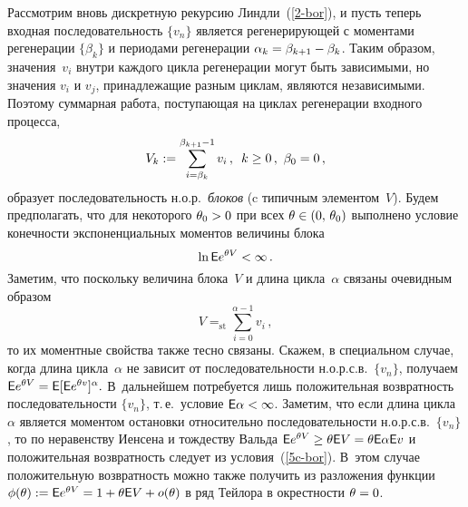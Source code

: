\begin{multicols}{2}
 Рассмотрим вновь дискретную рекурсию Линдли~(\ref{2-bor}), и пусть теперь входная
 последовательность $\{v_n\}$ является регенерирующей с моментами
регенерации $\{\beta_k\}$ и периодами регенерации
$\alpha_k\hm=\beta_{k+1}\hm-\beta_k$. Таким образом,  значения~$v_i$
внутри каждого цикла регенерации могут быть зависимыми, но значения
$v_i$ и $v_j$, принадлежащие разным циклам, являются независимыми.
Поэтому  суммарная работа, поступающая на циклах регенерации
входного процесса,
\begin{equation}
   V_k:=\sum\limits_{i=\beta_k}^{\beta_{k+1}-1}v_i\,,\enskip k\ge
  0\,,\ \beta_0=0\,,
  \label{vor-eq9}
\end{equation}
образует последовательность н.о.р.\ {\it блоков} (c типичным
элементом~$V$). Будем предполагать, что для некоторого $\theta_0\hm>0$
при всех $\theta\hm\in (0,\,\theta_0)$
 выполнено  условие конечности экспоненциальных моментов величины блока
\begin{equation}
\ln {\sf E} e^{\theta V}<\infty\,.\label{5c-bor}
\end{equation}
Заметим, что поскольку величина блока~$V$ и длина цикла~$\alpha$
связаны очевидным образом
\begin{equation}
V=_{\mathrm{st}}\sum\limits_{i=0}^{\alpha-1}v_i\,, \label{24-bor}
\end{equation}
то их  моментные свойства также тесно связаны.  Скажем, в
специальном случае, когда
длина цик\-ла~$\alpha$ не зависит от последовательности н.о.р.с.в.\
$\{v_n\}$,
получаем
$
{\sf E} e^{\theta V}= {\sf E} [{\sf E} e^{\theta v}]^{\alpha}.$ 
В~дальнейшем потребуется лишь положительная возвратность
последовательности $\{v_n\}$, т.\,е.\ условие  ${\sf E}\alpha<\infty$.
Заметим, что если  длина цикла~$\alpha$ является моментом остановки
относительно последовательности н.о.р.с.в.\ $\{v_n\}$,  то по
неравенству Иенсена и тождеству Вальда $ \e e^{\theta V}\hm\ge \theta
\e V\hm=\theta\e \alpha \e v $ и положительная возвратность следует из
условия~(\ref{5c-bor}). В~этом случае положительную  возвратность можно
также получить  из разложения функции $\phi(\theta):=\e e^{\theta
V}\hm=1\hm+\theta \e V\hm+o(\theta)$ в ряд Тейлора в окрестности $\theta\hm=0$.


\end{multicols}
